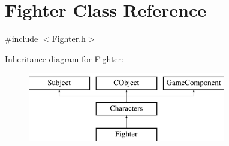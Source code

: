 \hypertarget{class_fighter}{}\section{Fighter Class Reference}
\label{class_fighter}


{\ttfamily \#include $<$Fighter.\+h$>$}

Inheritance diagram for Fighter\+:\begin{figure}[H]
\begin{center}
\leavevmode
\includegraphics[height=3.000000cm]{class_fighter}
\end{center}
\end{figure}
